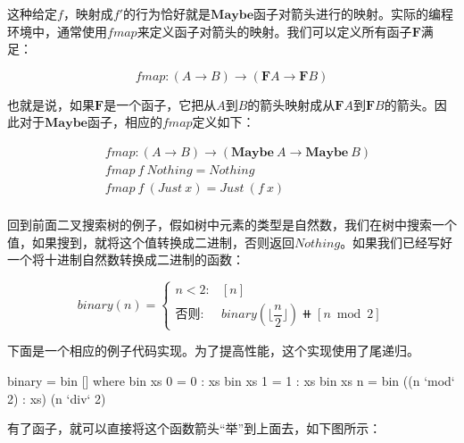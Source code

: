 \documentclass[b5paper]{ctexart}
\begin{document}
\begin{example}
这种给定$f$，映射成$f'$的行为恰好就是$\mathbf{Maybe}$函子对箭头进行的映射。实际的编程环境中，通常使用$fmap$来定义函子对箭头的映射。我们可以定义所有函子$\mathbf{F}$满足：

\[
fmap : (A \to B) \to (\mathbf{F} A \to \mathbf{F} B)
\]

也就是说，如果$\mathbf{F}$是一个函子，它把从$A$到$B$的箭头映射成从$\mathbf{F} A$到$\mathbf{F} B$的箭头。因此对于$\mathbf{Maybe}$函子，相应的$fmap$定义如下：

\[
\begin{array}{l}
\quad    fmap : (A \to B) \to (\mathbf{Maybe}\ A \to \mathbf{Maybe}\ B) \\
\quad    fmap\ f\ Nothing = Nothing \\
\quad    fmap\ f\ (Just\ x) = Just\ (f\ x) \\
\end{array}
\]

回到前面二叉搜索树的例子，假如树中元素的类型是自然数，我们在树中搜索一个值，如果搜到，就将这个值转换成二进制，否则返回$Nothing$。如果我们已经写好一个将十进制自然数转换成二进制的函数：

\[
binary(n) = \begin{cases}
n < 2: & [n] \\
\text{否则}: & binary(\lfloor\dfrac{n}{2}\rfloor)\doubleplus[n \bmod 2]
\end{cases}
\]

下面是一个相应的例子代码实现。为了提高性能，这个实现使用了尾递归。

\lstset{frame=single}
\begin{Haskell}
binary = bin [] where
   bin xs 0 = 0 : xs
   bin xs 1 = 1 : xs
   bin xs n = bin ((n `mod` 2) : xs) (n `div` 2)
\end{Haskell}

有了函子，就可以直接将这个函数箭头“举”到上面去，如下图所示：

\begin{center}
\end{center}


\end{example}
\end{document}
